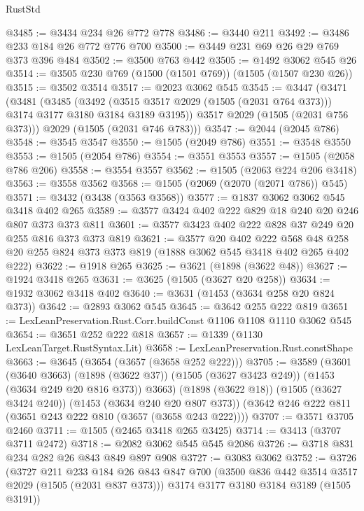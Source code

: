 \begin{lexlean}{RustStd}
\begin{coremodule}
@3485 := @3434 @234 @26 @772 @778
@3486 := @3440 @211
@3492 := @3486 @233 @184 @26 @772 @776 @700
@3500 := @3449 @231 @69 @26 @29 @769 @373 @396 @484
@3502 := @3500 @763 @442
@3505 := @1492 @3062 @545 @26
@3514 := @3505 @230 @769 (@1500 (@1501 @769)) (@1505 (@1507 @230 @26))
@3515 := @3502 @3514
@3517 := @2023 @3062 @545
@3545 := @3447
    (@3471
      (@3481
        (@3485
          (@3492 (@3515 @3517 @2029 (@1505 (@2031 @764 @373))) @3174 @3177 @3180 @3184 @3189 @3195))
        @3517
        @2029
        (@1505 (@2031 @756 @373)))
      @2029
      (@1505 (@2031 @746 @783)))
@3547 := @2044 (@2045 @786)
@3548 := @3545 @3547
@3550 := @1505 (@2049 @786)
@3551 := @3548 @3550
@3553 := @1505 (@2054 @786)
@3554 := @3551 @3553
@3557 := @1505 (@2058 @786 @206)
@3558 := @3554 @3557
@3562 := @1505 (@2063 @224 @206 @3418)
@3563 := @3558 @3562
@3568 := @1505 (@2069 (@2070 (@2071 @786)) @545)
@3571 := @3432 (@3438 (@3563 @3568))
@3577 := @1837 @3062 @3062 @545 @3418 @402 @265
@3589 := @3577 @3424 @402 @222 @829 @18 @240 @20 @246 @807 @373 @373 @811
@3601 := @3577 @3423 @402 @222 @828 @37 @249 @20 @255 @816 @373 @373 @819
@3621 := @3577
    @20
    @402
    @222
    @568
    @48
    @258
    @20
    @255
    @824
    @373
    @373
    @819
    (@1888 @3062 @545 @3418 @402 @265 @402 @222)
@3622 := @1918 @265
@3625 := @3621 (@1898 (@3622 @48))
@3627 := @1924 @3418 @265
@3631 := @3625 (@1505 (@3627 @20 @258))
@3634 := @1932 @3062 @3418 @402
@3640 := @3631 (@1453 (@3634 @258 @20 @824 @373))
@3642 := @2893 @3062 @545
@3645 := @3642 @255 @222 @819
@3651 := LexLeanPreservation.Rust.Corr.buildConst @1106 @1108 @1110 @3062 @545
@3654 := @3651 @252 @222 @818
@3657 := @1339 (@1130 LexLeanTarget.RustSyntax.Lit)
@3658 := LexLeanPreservation.Rust.constShape
@3663 := @3645 (@3654 (@3657 (@3658 @252 @222)))
@3705 := @3589
    (@3601
      (@3640 @3663)
      (@1898 (@3622 @37))
      (@1505 (@3627 @3423 @249))
      (@1453 (@3634 @249 @20 @816 @373))
      @3663)
    (@1898 (@3622 @18))
    (@1505 (@3627 @3424 @240))
    (@1453 (@3634 @240 @20 @807 @373))
    (@3642 @246 @222 @811 (@3651 @243 @222 @810 (@3657 (@3658 @243 @222))))
@3707 := @3571 @3705 @2460
@3711 := @1505 (@2465 @3418 @265 @3425)
@3714 := @3413 (@3707 @3711 @2472)
@3718 := @2082 @3062 @545 @545 @2086
@3726 := @3718 @831 @234 @282 @26 @843 @849 @897 @908
@3727 := @3083 @3062
@3752 := @3726
    (@3727
      @211
      @233
      @184
      @26
      @843
      @847
      @700
      (@3500 @836 @442 @3514 @3517 @2029 (@1505 (@2031 @837 @373)))
      @3174
      @3177
      @3180
      @3184
      @3189
      (@1505 @3191))

\end{coremodule}
\end{lexlean}
